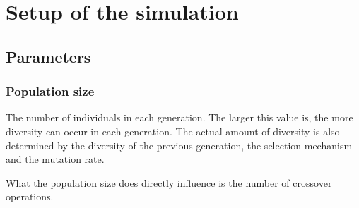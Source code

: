 \section{Setup of the simulation}
\subsection{Parameters}
\subsubsection{Population size}
The number of individuals in each generation. The larger this value is, the
more diversity can occur in each generation. The actual amount of diversity is
also determined by the diversity of the previous generation, the selection
mechanism and the mutation rate.

What the population size does directly influence is the number of crossover
operations. 
